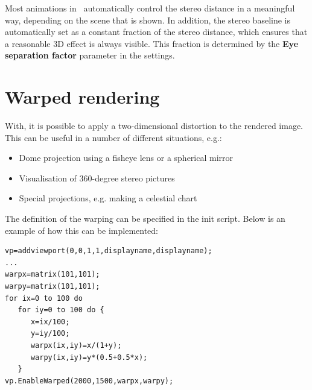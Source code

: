 Most animations in \softwarename\ automatically control the stereo distance in a meaningful way, depending on the scene that is shown. In addition, the stereo baseline is automatically set as a constant fraction of the stereo distance, which ensures that a reasonable 3D effect is always visible. This fraction is determined by the \textbf{Eye separation factor} parameter in the settings.



\section{Warped rendering}
With\softwarename, it is possible to apply a two-dimensional distortion to the rendered image. This can be useful in a number of different situations, e.g.:
\begin{itemize}
\item Dome projection using a fisheye lens or a spherical mirror
\item Visualisation of 360-degree stereo pictures
\item Special projections, e.g. making a celestial chart
\end{itemize}

The definition of the warping can be specified in the init script. Below is an example of how this can be implemented:

\begin{lstlisting}
vp=addviewport(0,0,1,1,displayname,displayname);
...
warpx=matrix(101,101);
warpy=matrix(101,101);
for ix=0 to 100 do
   for iy=0 to 100 do {
      x=ix/100;
      y=iy/100;
      warpx(ix,iy)=x/(1+y);
      warpy(ix,iy)=y*(0.5+0.5*x);
   }
vp.EnableWarped(2000,1500,warpx,warpy);
\end{lstlisting}
